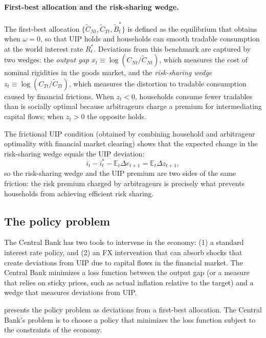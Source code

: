 \documentclass[12pt,a4paper]{article}
\begin{document}
\paragraph{First-best allocation and the risk-sharing wedge.} The first-best allocation $\{\tilde{C}_{Nt}, \tilde{C}_{Tt}, \tilde{B}^*_t\}$ is defined as the equilibrium that obtains when $\omega = 0$, so that UIP holds and households can smooth tradable consumption at the world interest rate $R^*_t$. Deviations from this benchmark are captured by two wedges: the \textit{output gap} $x_t \equiv \log(C_{Nt}/\tilde{C}_{Nt})$, which measures the cost of nominal rigidities in the goods market, and the \textit{risk-sharing wedge} $z_t \equiv \log(C_{Tt}/\tilde{C}_{Tt})$, which measures the distortion to tradable consumption caused by financial frictions. When $z_t < 0$, households consume fewer tradables than is socially optimal because arbitrageurs charge a premium for intermediating capital flows; when $z_t > 0$ the opposite holds.

The frictional UIP condition (obtained by combining household and arbitrageur optimality with financial market clearing) shows that the expected change in the risk-sharing wedge equals the UIP deviation:
\begin{equation}
    i_t - i^*_t - \mathbb{E}_t \Delta e_{t+1} = \mathbb{E}_t \Delta z_{t+1},
    \label{eq:uip_wedge}
\end{equation}
so the risk-sharing wedge and the UIP premium are two sides of the same friction: the risk premium charged by arbitrageurs is precisely what prevents households from achieving efficient risk sharing.

\subsection{The policy problem}

The Central Bank has two tools to intervene in the economy: (1) a standard interest rate policy, and (2) an FX intervention that can absorb shocks that create deviations from UIP due to capital flows in the financial market. The Central Bank minimizes a loss function between the output gap (or a measure that relies on sticky prices, such as actual inflation relative to the target) and a wedge that measures deviations from UIP.

\cite{itskhokimukhin2025} presents the policy problem as deviations from a first-best allocation. The Central Bank's problem is to choose a policy that minimizes the loss function subject to the constraints of the economy.
\end{document}

